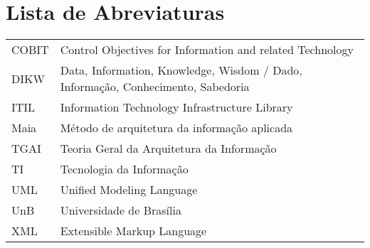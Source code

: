 %
%

\chapter*{Lista de Abreviaturas} 						

\begin{tabular}[t]{p{2cm} p{13.5cm}}
COBIT	& Control Objectives for Information and related
Technology \\
DIKW		& Data, Information, Knowledge, Wisdom / Dado, Informação,
Conhecimento, Sabedoria\\
ITIL		& Information Technology Infrastructure Library \\
Maia		& Método de arquitetura da informação aplicada \\
TGAI		& Teoria Geral da Arquitetura da Informação \\
TI		& Tecnologia da Informação \\
UML		& Unified Modeling Language \\
UnB		& Universidade de Brasília \\
XML		& Extensible Markup Language
\end{tabular}


